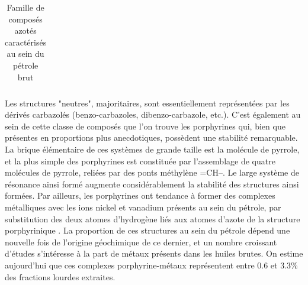 \begin{table}[h!]
\begin{center}
\begin{tabular}{rl}
			\hline 
		\end{tabular}
	\end{center}
	\caption{Famille de composés azotés caractérisés au sein du pétrole brut}
	\label{tab:azote}
\end{table}


Les structures "neutres", majoritaires, sont essentiellement représentées par les dérivés carbazolés (benzo-carbazoles, dibenzo-carbazole, etc.). C'est également au sein de cette classe de composés que l'on trouve les porphyrines qui, bien que présentes en proportions plus anecdotiques, possèdent une stabilité remarquable. La brique élémentaire de ces systèmes de grande taille est la molécule de pyrrole, et la plus simple des porphyrines est constituée par l'assemblage de quatre molécules de pyrrole, reliées par des ponts méthylène =CH--. Le large système de résonance ainsi formé augmente considérablement la stabilité des structures ainsi formées. Par ailleurs, les porphyrines ont tendance à former des complexes métalliques avec les ions nickel et vanadium présents au sein du pétrole, par substitution des deux atomes d'hydrogène liés aux atomes d'azote de la structure porphyrinique \cite{eyssautier2011insight}. La proportion de ces structures au sein du pétrole dépend une nouvelle fois de l'origine géochimique de ce dernier, et un nombre croissant d'études s'intéresse à la part de métaux présents dans les huiles brutes. On estime aujourd'hui que ces complexes porphyrine-métaux représentent entre 0.6 et 3.3\% des fractions lourdes extraites\cite{merdrignac2007physicochemical, speight2004petroleum}.

